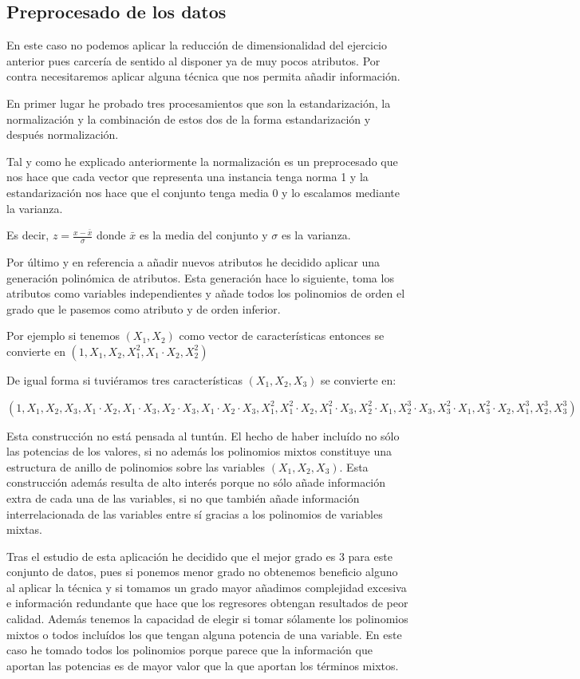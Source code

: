 \documentclass[12pt,a4paper]{article}
\begin{document}
\subsection{Preprocesado de los datos}

En este caso no podemos aplicar la reducción de dimensionalidad del ejercicio anterior pues carcería de sentido al disponer ya de muy pocos atributos. Por contra necesitaremos aplicar alguna técnica que nos permita añadir información.

En primer lugar he probado tres procesamientos que son la estandarización, la normalización y la combinación de estos dos de la forma estandarización y después normalización. 

Tal y como he explicado anteriormente la normalización es un preprocesado que nos hace que cada vector que representa una instancia tenga norma 1 y la estandarización nos hace que el conjunto tenga media 0 y lo escalamos mediante la varianza.

Es decir, $z = \frac{x-\bar{x}}{\sigma}$ donde $\bar{x}$ es la media del conjunto y $\sigma$ es la varianza.

Por último y en referencia a añadir nuevos atributos he decidido aplicar una generación polinómica de atributos. Esta generación hace lo siguiente, toma los atributos como variables independientes y añade todos los polinomios de orden el grado que le pasemos como atributo y de orden inferior.

Por ejemplo si tenemos $(X_1 , X_2)$ como vector de características entonces se convierte en $(1,X_1,X_2,X_1^2,X_1\cdot X_2,X_2^2)$

De igual forma si tuviéramos tres características $(X_1,X_2,X_3)$ se convierte en:

$(1,X_1,X_2,X_3,X_1\cdot X_2,X_1\cdot X_3,X_2\cdot X_3,X_1\cdot X_2\cdot X_3, X_1^2, X_1^2\cdot X_2, X_1^2\cdot X_3, X_2^2\cdot X_1, X_2^3\cdot X_3, X_3^2\cdot X_1, X_3^2\cdot X_2, X_1^3, X_2^3, X_3^3)$

Esta construcción no está pensada al tuntún. El hecho de haber incluído no sólo las potencias de los valores, si no además los polinomios mixtos constituye una estructura de anillo de polinomios sobre las variables $(X_1, X_2, X_3)$. Esta construcción además resulta de alto interés porque no sólo añade información extra de cada una de las variables, si no que también añade información interrelacionada de las variables entre sí gracias a los polinomios de variables mixtas.

Tras el estudio de esta aplicación he decidido que el mejor grado es 3 para este conjunto de datos, pues si ponemos menor grado no obtenemos beneficio alguno al aplicar la técnica y si tomamos un grado mayor añadimos complejidad excesiva e información redundante que hace que los regresores obtengan resultados de peor calidad. Además tenemos la capacidad de elegir si tomar sólamente los polinomios mixtos o todos incluídos los que tengan alguna potencia de una variable. En este caso he tomado todos los polinomios porque parece que la información que aportan las potencias es de mayor valor que la que aportan los términos mixtos.
\end{document}
